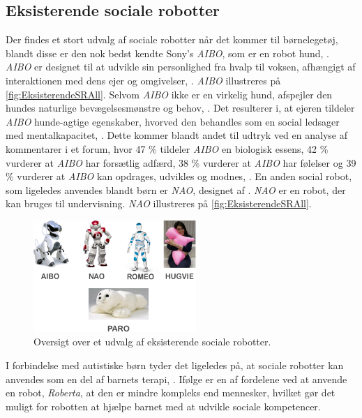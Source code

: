 \subsection{Eksisterende sociale robotter}
\label{EksisterendeSocialeRobotter}
%
Der findes et stort udvalg af sociale robotter når det kommer til børnelegetøj, blandt disse er den nok bedst kendte Sony's \textit{AIBO}, som er en robot hund, \parencite{WEB:AIBO}. \textit{AIBO} er designet til at udvikle sin personlighed fra hvalp til voksen, afhængigt af interaktionen med dens ejer og omgivelser, \parencite{WEB:AIBO}. \textit{AIBO} illustreres på \autoref{fig:EksisterendeSRAll}. Selvom \textit{AIBO} ikke er en virkelig hund, afspejler den hundes naturlige bevægelsesmønstre og behov, \parencite[ss. 191-198]{PDF:AnEthologicalEmotional}. Det resulterer i, at ejeren tildeler \textit{AIBO} hunde-agtige egenskaber, hvorved den behandles som en social ledsager med mentalkapacitet, \parencite[s. 2]{PDF:SharingALifeHarvey}. Dette kommer blandt andet til udtryk ved en analyse af kommentarer i et forum, hvor 47 \% tildeler \textit{AIBO} en biologisk essens, 42 \% vurderer at \textit{AIBO} har forsætlig adfærd, 38 \% vurderer at \textit{AIBO} har følelser og 39 \% vurderer at \textit{AIBO} kan opdrages, udvikles og modnes, \parencite[s. 26]{PDF:InTheCompanyofRobots}. En anden social robot, som ligeledes anvendes blandt børn er \textit{NAO}, designet af \textcite{WEB:NAO}. \textit{NAO} er en robot, der kan bruges til undervisning. \textit{NAO} illustreres på \autoref{fig:EksisterendeSRAll}.
%
\begin{figure}[H]
\centering
\includegraphics[width = 0.55\textwidth]{Figure/EksisterendeSRAll} 
\caption{Oversigt over et udvalg af eksisterende sociale robotter.}
\label{fig:EksisterendeSRAll}
\end{figure}
\noindent 
%  
I forbindelse med autistiske børn tyder det ligeledes på, at sociale robotter kan anvendes som en del af barnets terapi, \parencite[s. 180]{PDF:GamesChrildrenAutism}. Ifølge \textcite[s. 185]{PDF:GamesChrildrenAutism} er en af fordelene ved at anvende en robot, \textit{Roberta}, at den er mindre kompleks end mennesker, hvilket gør det muligt for robotten at hjælpe barnet med at udvikle sociale kompetencer.
  
